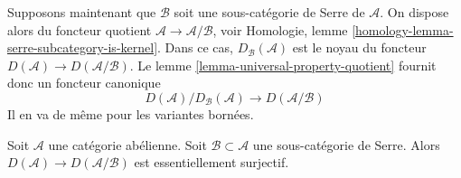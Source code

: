 \medskip\noindent
Supposons maintenant que $\mathcal{B}$ soit une sous-catégorie de Serre de
$\mathcal{A}$. On dispose alors du foncteur quotient
$\mathcal{A} \to \mathcal{A}/\mathcal{B}$, voir Homologie, lemme
\ref{homology-lemma-serre-subcategory-is-kernel}. Dans ce cas,
$D_\mathcal{B}(\mathcal{A})$ est le noyau du foncteur
$D(\mathcal{A}) \to D(\mathcal{A}/\mathcal{B})$. Le
lemme \ref{lemma-universal-property-quotient} fournit donc un foncteur
canonique
$$
D(\mathcal{A})/D_\mathcal{B}(\mathcal{A})
\longrightarrow
D(\mathcal{A}/\mathcal{B})
$$
Il en va de même pour les variantes bornées.

\begin{lemma}
\label{lemma-derived-of-quotient}
Soit $\mathcal{A}$ une catégorie abélienne. Soit
$\mathcal{B} \subset \mathcal{A}$ une sous-catégorie de Serre. Alors
$D(\mathcal{A}) \to D(\mathcal{A}/\mathcal{B})$ est essentiellement
surjectif.
\end{lemma}

